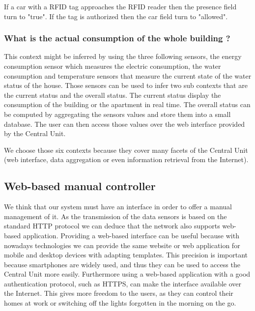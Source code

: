 \documentclass{acm_proc_article-sp}
\begin{document}
If a car with a RFID tag approaches the RFID reader then the presence field turn to "true". If the tag is authorized then the car field turn to "allowed".
 \subsubsection*{What is the actual consumption of the whole building ?}
 This context might be inferred by using the three following sensors, the energy consumption sensor which measures the electric consumption, 
 the water consumption and temperature sensors that measure the current state of the water status of the house.
 Those sensors can be used to infer two sub contexts that are the current status and the overall status.
 The current status display the consumption of the building or the apartment in real time.
 The overall status can be computed by aggregating the sensors values and store them into a small database.
 The user can then access those values over the web interface provided by the Central Unit.

We choose those six contexts because they cover many facets of the Central Unit (web interface, data aggregation or even information retrieval from the Internet).

\subsection{Web-based manual controller}
We think that our system must have an interface in order to offer a manual management of it.
As the transmission of the data sensors is based on the standard HTTP protocol we can deduce that the network also supports web-based application.
Providing a web-based interface can be useful because with nowadays technologies we can provide the same website or web application for mobile and desktop devices with adapting templates.
This precision is important because smartphones are widely used, and thus they can be used to access the Central Unit more easily. 
Furthermore using a web-based application with a good authentication protocol, such as HTTPS, can make the interface available over the Internet.
This gives more freedom to the users, as they can control their homes at work or switching off the lights forgotten in the morning on the go.
\end{document}
